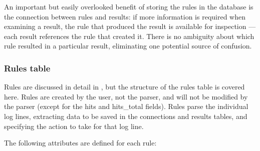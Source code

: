 An important but easily overlooked benefit of storing the rules in the
database is the connection between rules and results: if more information
is required when examining a result, the rule that produced the result is
available for inspection --- each result references the rule that created
it.  There is no ambiguity about which rule resulted in a particular
result, eliminating one potential source of confusion.

\subsubsection{Rules table}

\label{rule attributes}

Rules are discussed in detail in , but the structure of
the rules table is covered here.  Rules are created by the user, not the
parser, and will not be modified by the parser (except for the hits and
hits\_total fields).  Rules parse the individual log lines, extracting data
to be saved in the connections and results tables, and specifying the
action to take for that log line.

The following attributes are defined for each rule:

